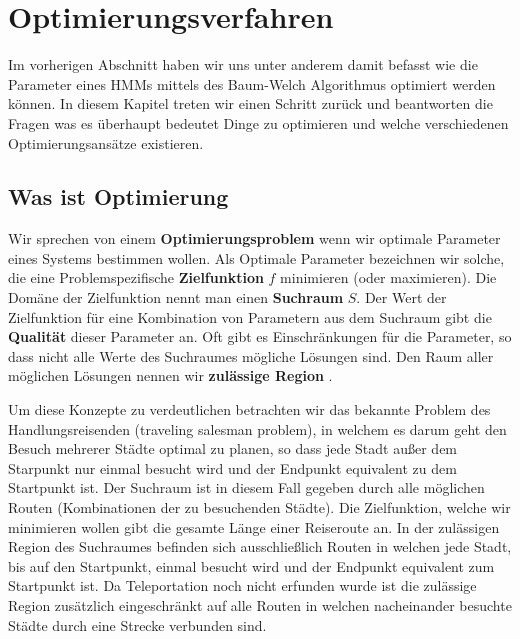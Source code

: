 \section{Optimierungsverfahren}


Im vorherigen Abschnitt haben wir uns unter anderem damit befasst wie die Parameter eines HMMs mittels des Baum-Welch Algorithmus optimiert werden können. In diesem Kapitel treten wir einen Schritt zurück und beantworten die Fragen was es überhaupt bedeutet Dinge zu optimieren und welche verschiedenen Optimierungsansätze existieren.

\subsection{Was ist Optimierung}
Wir sprechen von einem \textbf{Optimierungsproblem} wenn wir optimale Parameter eines Systems bestimmen wollen. Als Optimale Parameter bezeichnen wir solche, die eine Problemspezifische \textbf{Zielfunktion} $f$ minimieren (oder maximieren). Die Domäne der Zielfunktion nennt man einen \textbf{Suchraum} $S$. Der Wert der Zielfunktion für eine Kombination von Parametern aus dem Suchraum gibt die \textbf{Qualität} dieser Parameter an. Oft gibt es Einschränkungen für die Parameter, so dass nicht alle Werte des Suchraumes mögliche Lösungen sind. Den Raum aller möglichen Lösungen nennen wir \textbf{zulässige Region} \cite*{MetaheuristicsEGT}.

Um diese Konzepte zu verdeutlichen betrachten wir das bekannte Problem des Handlungsreisenden (traveling salesman problem), in welchem es darum geht den Besuch mehrerer Städte optimal zu planen, so dass jede Stadt außer dem Starpunkt nur einmal besucht wird und der Endpunkt equivalent zu dem Startpunkt ist. Der Suchraum ist in diesem Fall gegeben durch alle möglichen Routen (Kombinationen der zu besuchenden Städte). Die Zielfunktion, welche wir minimieren wollen gibt die gesamte Länge einer Reiseroute an. In der zulässigen Region des Suchraumes befinden sich ausschließlich Routen in welchen jede Stadt, bis auf den Startpunkt, einmal besucht wird und der Endpunkt equivalent zum Startpunkt ist. Da Teleportation noch nicht erfunden wurde ist die zulässige Region zusätzlich eingeschränkt auf alle Routen in welchen nacheinander besuchte Städte durch eine Strecke verbunden sind.

